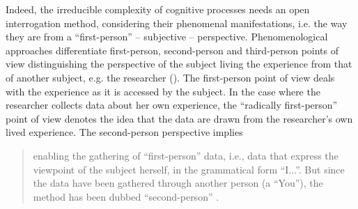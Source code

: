 \documentclass[output=paper]{langscibook}
\begin{document}
\begin{sloppypar}
Indeed, the irreducible complexity of cognitive processes needs an open interrogation method, considering their phenomenal manifestations, i.e. the way they are from a “first-person” -- subjective -- perspective. Phenomenological approaches differentiate first-person, second-person and third-person points of view distinguishing the perspective of the subject living the experience from that of another subject, e.g. the researcher (\citealt{DeprazEtAl2003}). The first-person point of view deals with the experience as it is accessed by the subject. In the case where the researcher collects data about her own experience, the “radically first-person” point of view denotes the idea that the data are drawn from the researcher’s own lived experience. The second-person perspective implies 
\end{sloppypar}
\begin{quote}
enabling the gathering of “first-person” data, i.e., data that express the viewpoint of the subject herself, in the grammatical form “I...”. But since the data have been gathered through another person (a “You”), the method has been dubbed “second-person” \citep[230--231]{Petitmengin2006}.
\end{quote}
\end{document}

